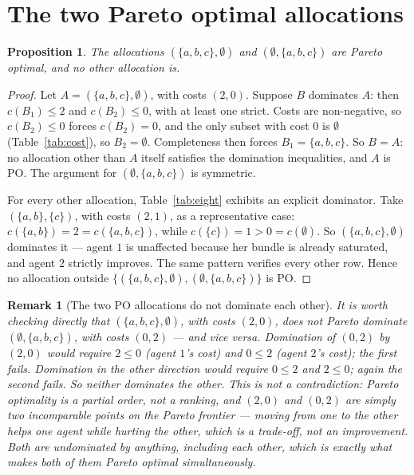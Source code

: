 \documentclass[11pt]{article}
\newtheorem{proposition}[definition]{Proposition}
\newtheorem{remark}[definition]{Remark}
\begin{document}
\section{The two Pareto optimal allocations}
\label{sec:po-two}

\begin{proposition}
\label{prop:po}
The allocations $(\{a,b,c\},\emptyset)$ and $(\emptyset,\{a,b,c\})$ are
Pareto optimal, and no other allocation is.
\end{proposition}

\begin{proof}
Let $A = (\{a,b,c\},\emptyset)$, with costs $(2,0)$. Suppose $B$ dominates
$A$: then $c(B_1) \le 2$ and $c(B_2) \le 0$, with at least one strict. Costs
are non-negative, so $c(B_2) \le 0$ forces $c(B_2) = 0$, and the only subset
with cost $0$ is $\emptyset$ (Table~\ref{tab:cost}), so $B_2 = \emptyset$.
Completeness then forces $B_1 = \{a,b,c\}$. So $B = A$: no allocation other
than $A$ itself satisfies the domination inequalities, and $A$ is PO. The
argument for $(\emptyset,\{a,b,c\})$ is symmetric.

For every other allocation, Table~\ref{tab:eight} exhibits an explicit
dominator. Take $(\{a,b\},\{c\})$, with costs $(2,1)$, as a representative
case: $c(\{a,b\}) = 2 = c(\{a,b,c\})$, while $c(\{c\}) = 1 > 0 = c(\emptyset)$.
So $(\{a,b,c\},\emptyset)$ dominates it --- agent $1$ is unaffected because her
bundle is already saturated, and agent $2$ strictly improves. The same pattern
verifies every other row. Hence no allocation outside
$\{(\{a,b,c\},\emptyset), (\emptyset,\{a,b,c\})\}$ is PO.
\end{proof}

\begin{remark}[The two PO allocations do not dominate each other]
\label{rem:incomparable}
It is worth checking directly that $(\{a,b,c\},\emptyset)$, with costs
$(2,0)$, does \emph{not} Pareto dominate $(\emptyset,\{a,b,c\})$, with costs
$(0,2)$ --- and vice versa. Domination of $(0,2)$ by $(2,0)$ would require
$2 \le 0$ (agent $1$'s cost) \emph{and} $0 \le 2$ (agent $2$'s cost); the
first fails. Domination in the other direction would require $0 \le 2$
\emph{and} $2 \le 0$; again the second fails. So neither dominates the other.
This is not a contradiction: Pareto optimality is a partial order, not a
ranking, and $(2,0)$ and $(0,2)$ are simply two incomparable points on the
Pareto frontier --- moving from one to the other helps one agent while
hurting the other, which is a trade-off, not an improvement. Both are
undominated by anything, including each other, which is exactly what makes
both of them Pareto optimal simultaneously.
\end{remark}
\end{document}
